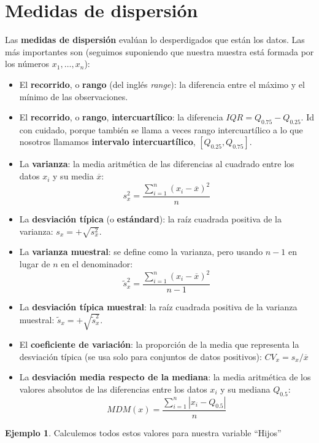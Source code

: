\documentclass[
]{book}
\theoremstyle{definition}
\theoremstyle{definition}
\newtheorem{example}{Ejemplo}[chapter]
\theoremstyle{definition}
\theoremstyle{definition}
\theoremstyle{remark}
\begin{document}
\hypertarget{medidas-de-dispersiuxf3n}{%
\section{Medidas de dispersión}\label{medidas-de-dispersiuxf3n}}

Las \textbf{medidas de dispersión} evalúan lo desperdigados que están los datos. Las más importantes son (seguimos suponiendo que nuestra muestra está formada por los números \(x_1,\ldots,x_n\)):

\begin{itemize}
\item
  El \textbf{recorrido}, o \textbf{rango} (del inglés \emph{range}): la diferencia entre el máximo y el mínimo de las observaciones.
\item
  El \textbf{recorrido}, o \textbf{rango}, \textbf{intercuartílico}: la diferencia \(\mathit{IQR}=Q_{0.75}-Q_{0.25}\). Id con cuidado, porque también se llama a veces rango intercuartílico a lo que nosotros llamamos \textbf{intervalo intercuartílico}, \([Q_{0.25},Q_{0.75}]\).
\item
  La \textbf{varianza}: la media aritmética de las diferencias al cuadrado entre los datos \(x_i\) y su media \(\overline{x}\):
  \[
  s_x^2=\frac{\sum_{i=1}^n (x_i-\overline{x})^2}{n}
  \]
\item
  La \textbf{desviación típica} (o \textbf{estándard}): la raíz cuadrada positiva de la varianza: \(s_x=+\sqrt{s_x^2}\).
\item
  La \textbf{varianza muestral}: se define como la varianza, pero usando \(n-1\) en lugar de \(n\) en el denominador:
  \[
  \tilde{s}_x^2 =\frac{\sum_{i=1}^n (x_i-\overline{x})^2}{n-1}
  \]
\item
  La \textbf{desviación típica muestral}: la raíz cuadrada positiva de la varianza muestral: \(\tilde{s}_x=+\sqrt{\tilde{s}_x^2}\).
\item
  El \textbf{coeficiente de variación}: la proporción de la media que representa la desviación típica (se usa solo para conjuntos de datos positivos): \(CV_x=s_x/\overline{x}\)
\item
  La \textbf{desviación media respecto de la mediana}: la media aritmética de los valores absolutos de las diferencias entre los datos \(x_i\) y su mediana \(Q_{0.5}\):
  \[
  MDM(x)=\frac{\sum_{i=1}^n |x_i-Q_{0.5}|}{n}
  \]
\end{itemize}

\begin{example}
\protect\hypertarget{exm:unnamed-chunk-264}{}\label{exm:unnamed-chunk-264}Calculemos todos estos valores para nuestra variable ``Hijos''
\end{example}
\end{document}
